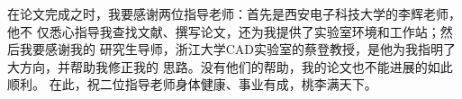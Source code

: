 \begin{thanksfor}
在论文完成之时，我要感谢两位指导老师：首先是西安电子科技大学的李辉老师，他不
仅悉心指导我查找文献、撰写论文，还为我提供了实验室环境和工作站；然后我要感谢我的
研究生导师，浙江大学CAD实验室的蔡登教授，是他为我指明了大方向，并帮助我修正我的
思路。没有他们的帮助，我的论文也不能进展的如此顺利。
在此，祝二位指导老师身体健康、事业有成，桃李满天下。
\end{thanksfor}